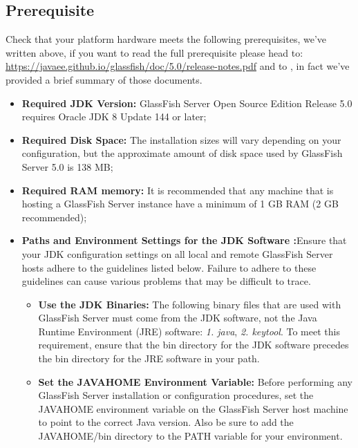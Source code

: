\subsection{Prerequisite}
\label{subsect:Prerequisite}
Check that your platform hardware meets the following prerequisites, we've written above, if you want to read the full prerequisite please head to: \href{https://javaee.github.io/glassfish/doc/5.0/release-notes.pdf}{\color{blue}https://javaee.github.io/glassfish/doc/5.0/release-notes.pdf} and to , in fact we've provided a brief summary of those documents.
\begin{itemize}
	\item \textbf{Required JDK Version:} GlassFish Server Open Source Edition Release 5.0 requires Oracle JDK 8 Update 144 or later;
	\item \textbf{Required Disk Space:} The installation sizes will vary depending on your configuration, but the approximate amount of disk space used by GlassFish Server 5.0 is 138 MB;
	\item \textbf{Required RAM memory:} It is recommended that any machine that is hosting a GlassFish Server instance have a minimum of 1 GB RAM (2 GB recommended); 
	\item \textbf{Paths and Environment Settings for the JDK Software :}Ensure that your JDK configuration settings on all local and remote GlassFish Server hosts adhere to the guidelines listed below. Failure to adhere to these guidelines can cause various problems that may be difficult to trace.
	\begin{itemize}
		\item \textbf{Use the JDK Binaries:} The following binary files that are used with GlassFish Server must come from the JDK software, not the Java Runtime Environment (JRE) software: \textit{1. java}, \textit{2. keytool}. To meet this requirement, ensure that the bin directory for the JDK software precedes the bin directory for the JRE software in your path.
		\item \textbf{Set the JAVA\textunderscore HOME Environment Variable:} Before performing any GlassFish Server installation or configuration procedures, set the JAVA\textunderscore HOME environment variable on the GlassFish Server host machine to point to the correct Java version. Also be sure to add the JAVA\textunderscore HOME/bin directory to the PATH variable for your environment.
	\end{itemize}
\end{itemize}


